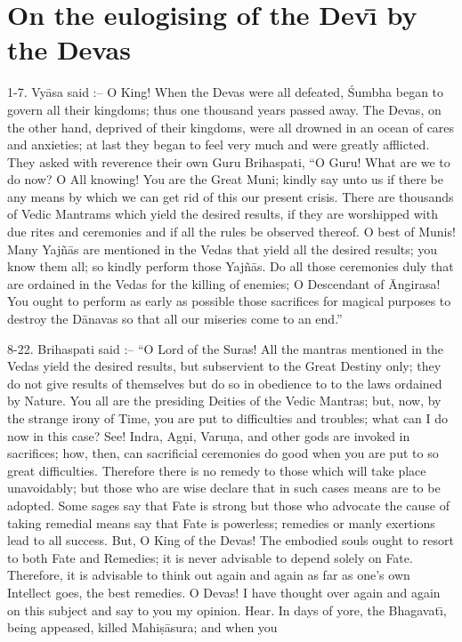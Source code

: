 \chapter{On the eulogising of the Dev\={\i} by the Devas}

1-7. Vy\=asa said :-- O King! When the Devas were all defeated, \'Sumbha began to govern all their kingdoms; thus one thousand years passed away. The Devas, on the other hand, deprived of their kingdoms, were all drowned in an ocean of cares and anxieties; at last they began to feel very much and were greatly afflicted. They asked with reverence their own Guru Brihaspati, ``O Guru! What are we to do now? O All knowing! You are the Great Muni; kindly say unto us if there be any means by which we can get rid of this our present crisis. There are thousands of Vedic Mantrams which yield the desired results, if they are worshipped with due rites and ceremonies and if all the rules be observed thereof. O best of Munis! Many Yaj\~n\=as are mentioned in the Vedas that yield all the desired results; you know them all; so kindly perform those Yaj\~n\=as. Do all those ceremonies duly that are ordained in the Vedas for the killing of enemies; O Descendant of \=Angirasa! You ought to perform as early as possible those sacrifices for magical purposes to destroy the D\=anavas so that all our miseries come to an end.''

8-22. Brihaspati said :-- ``O Lord of the Suras! All the mantras mentioned in the Vedas yield the desired results, but subservient to the Great Destiny only; they do not give results of themselves but do so in obedience to to the laws ordained by Nature. You all are the presiding Deities of the Vedic Mantras; but, now, by the strange irony of Time, you are put to difficulties and troubles; what can I do now in this case? See! Indra, Ag\d{n}i, Varu\d{n}a, and other gods are invoked in sacrifices; how, then, can sacrificial ceremonies do good when you are put to so great difficulties. Therefore there is no remedy to those which will take place unavoidably; but those who are wise declare that in such cases means are to be adopted. Some sages say that Fate is strong but those who advocate the cause of taking remedial means say that Fate is powerless; remedies or manly exertions lead to all success. But, O King of the Devas! The embodied souls ought to resort to both Fate and Remedies; it is never advisable to depend solely on Fate. Therefore, it is advisable to think out again and again as far as one's own Intellect goes, the best remedies. O Devas! I have thought over again and again on this subject and say to you my opinion. Hear. In days of yore, the Bhagavat\={\i}, being appeased, killed Mahi\d{s}\=asura; and when you

